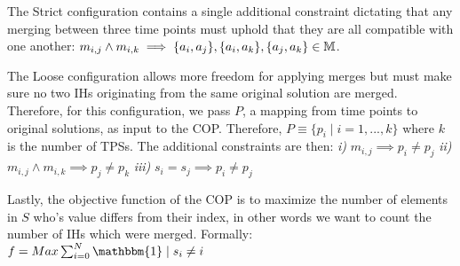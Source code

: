 The Strict configuration contains a single additional constraint dictating that any merging between three time points must uphold that they are all compatible with one another:
 $m_{i, j} \wedge m_{i, k} \implies \{a_i, a_j\},\{a_i, a_k\},\{a_j, a_k\} \in \mathbb{M}$.
    
The Loose configuration allows more freedom for applying merges but must make sure no two IHs originating from the same original solution are merged. Therefore, for this configuration, we pass $P$, a mapping from time points to original solutions, as input to the COP. Therefore, $P \equiv \{p_i \mid  i = 1,...,k \}$ where $k$ is the number of TPSs. The additional constraints are then:  
\textit{i)} $m_{i, j} \implies p_i \neq p_j$ \textit{ii)} $m_{i, j} \wedge m_{i, k} \implies p_j \neq p_k $ \textit{iii)} $ s_i = s_j \implies p_i \neq p_j$

Lastly, the objective function of the COP is to maximize the number of elements in $S$ who's value differs from their index, in other words we want to count the number of IHs which were merged. Formally: 
$f = Max \sum_{i=0}^{N} \mathbbm{1} \;|\;s_i \neq i$